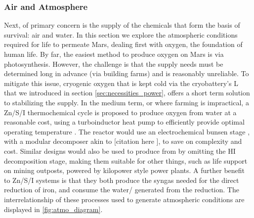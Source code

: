 \documentclass[fleqn,10pt]{Stylesheet} %
\begin{document}
\subsubsection{Air and Atmosphere}
\label{sec:necessities_air}



Next, of primary concern is the supply of the chemicals that form the basis of survival: air and water. In this section we explore the atmospheric conditions required for life to permeate Mars, dealing first with oxygen, the foundation of human life. By far, the easiest method to produce oxygen on Mars is via photosynthesis. However, the challenge is that the supply needs must be determined long in advance (via building farms) and is reasonably unreliable. To mitigate this issue, cryogenic oxygen that is kept cold via the cryobattery’s L that we introduced in section \ref{sec:necessities_power}, offers a short term solution to stabilizing the supply. In the medium term, or where farming is impractical, a Zn/S/I thermochemical cycle \cite{YanweiZhang2013} is proposed to produce oxygen from water at a reasonable cost, using a turboinductor heat pump to efficiently provide optimal operating temperature \cite{JohnBucknellVideo, 2013Dujarric}. The reactor would use an electrochemical bunsen stage \cite{YanweiZhang2016}, with a modular decomposer akin to [citation here ], to save on complexity and cost. Similar designs would also be used to produce  from  by omitting the HI decomposition stage, making them suitable for other things, such as life support on mining outposts, powered by kilopower style power plants. A further benefit to Zn/S/I systems is that they both produce the syngas needed for the direct reduction of iron, and consume the water/ generated from the reduction. The interrelationship of these processes used to generate atmospheric conditions are displayed in \ref{fig:atmo_diagram}. 
\end{document}

